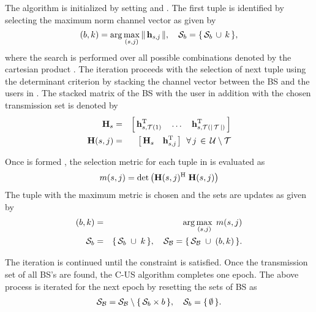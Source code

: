 The algorithm is initialized by setting  and . The first tuple  is identified by selecting the maximum norm channel vector  as given by
\begin{equation}
(b,k) = \arg \max_{(s,j)} \gnorm{\mvecxyz{h}{s}{j}}, \quad \mc{S}_b = \setcont{\mc{S}_b \, \cup \, k},
\label{cus-e1}
\end{equation}
where the search is performed over all possible combinations denoted by the cartesian product . The iteration proceeds with the selection of next tuple using the determinant criterion by stacking the channel vector between the \ac{BS}  and the users in . The stacked matrix of the \ac{BS}  with the user  in addition with the chosen transmission set  is denoted by
\begin{eqnarray}
\mbf{H}_s &=& \matscont{\mvecnxyz{h}{s}{\mc{T}(1)}^{\mrm{T}} \quad \dotsc \quad \mvecnxyz{h}{s}{\mc{T}(\card{\mc{T}})}^{\mrm{T}}} \label{cus-e2:1} \\
\mbf{H}(s,j) &=& \matscont{\mbf{H}_s \quad \mvecxyz{h}{s}{j}^{\mrm{T}}} \; \fall j \inm \mc{U} \bs \mc{T}
\label{cus-e2}
\end{eqnarray}

Once  is formed , the selection metric for each tuple in  is evaluated as
\begin{equation}
m(s,j) = \det \left ( \mbf{H}(s,j)^\mrm{H} \; \mbf{H}(s,j) \right )
\label{cus-e4}
\end{equation}
The tuple with the maximum metric  is chosen and the sets are updates as given by
\begin{eqnarray}
(b,k) &=& \arg \max_{(s,j)} \; m(s,j) \label{cus-e5:1} \\
\mc{S}_b &=& \setcont{\mc{S}_b \; \cup \; k}, \quad \mc{S}_{\mc{B}} = \setcont{\mc{S}_{\mc{B}} \; \cup \; (b,k)}.
\label{cus-e5}
\end{eqnarray}

The iteration is continued until the constraint  is satisfied. Once the transmission set  of all \ac{BS}'s are found, the \ac{C-US} algorithm completes one epoch. The above process is iterated for the next epoch by resetting the sets of \ac{BS}  as
\begin{eqnarray}
\mc{S}_{\mc{B}} = \mc{S}_{\mc{B}} \bs \setcont{\mc{S}_b \times b} \label{cus-e6:1}, \quad \mc{S}_b = \setcont{\emptyset}.
\label{cus-e6}
\end{eqnarray}

